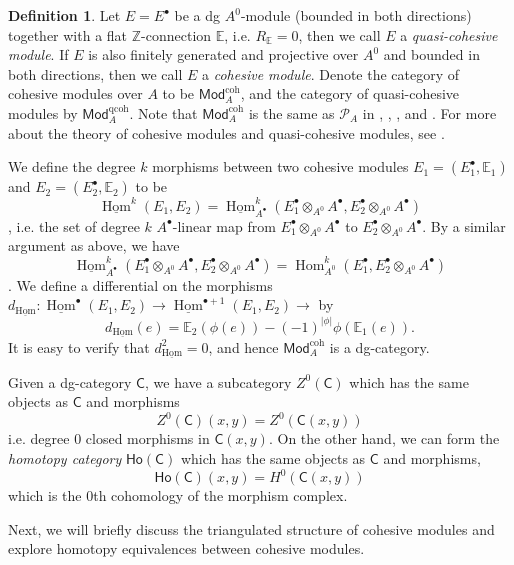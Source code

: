 \documentclass[12pt]{amsart}
\theoremstyle{definition}
\newtheorem{defn}[thm]{Definition}
\theoremstyle{remark}
\numberwithin{equation}{section}
\newcommand{\CC}{{\mathsf C}}
\newcommand{\Z}{{\mathbb{Z}}}
\newcommand{\1}{{\mathbb{1}}}
\newcommand{\Mod}{\mathsf{Mod}}
\newcommand{\ho}{\mathsf{Ho}}
\newcommand{\coh}{{\operatorname{coh}}}
\newcommand{\qcoh}{{\operatorname{qcoh}}}
\newcommand{\Hom}{\operatorname{Hom}}
\newcommand{\HOM}{\underline{\operatorname{Hom}}}
\begin{document}
\begin{defn}
    Let $E = E^{\bullet}$ be a dg ${A}^0$-module (bounded in both directions) together with a flat $\Z$-connection $\mathbb{E}$, i.e. $R_{\mathbb{E}} = 0$, then we call $E$ a {\it quasi-cohesive module}. If $E$ is also finitely generated and projective over $A^0$ and bounded in both directions, then we call $E$ a {\it cohesive module}. Denote the category of cohesive modules over ${A}$ to be $\Mod^{\coh}_{{A}}$, and the category of quasi-cohesive modules by $\Mod^{\qcoh}_{{A}}$. Note that $\Mod^{\coh}_{{A}}$ is the same as $\mathcal{P}_A$ in \cite{Blo05}, \cite{BS14}, \cite{BD10}, and \cite{BZ21}. For more about the theory of cohesive modules and quasi-cohesive modules, see \cite{Blo05}.
\end{defn}

We define the degree $k$ morphisms between two cohesive modules $E_1 = (E_1^{\bullet}, \mathbb{E}_1)$ and $E_2 = (E_2^{\bullet}, \mathbb{E}_2)$ to be $$
\HOM^k(E_1, E_2) =  \HOM_{A^{\bullet}}^k(E^{\bullet}_1\otimes_{ A^0} A^{\bullet}, E^{\bullet}_2\otimes_{ A^0} A^{\bullet})
$$
, i.e. the set of degree $k$ $A^{\bullet}$-linear map from $E^{\bullet}_1\otimes_{ A^0} A^{\bullet}$ to  $E^{\bullet}_2\otimes_{ A^0} A^{\bullet}$. By a similar argument as above, we have 
$$
\HOM_{A^{\bullet}}^k(E^{\bullet}_1\otimes_{ A^0} A^{\bullet}, E^{\bullet}_2\otimes_{ A^0} A^{\bullet}) = \Hom_{A^{0}}^k(E^{\bullet}_1, E^{\bullet}_2\otimes_{ A^0} A^{\bullet})
$$. We define a differential on the morphisms $d_{\HOM}: \HOM^{\bullet}(E_1, E_2) \to \HOM^{\bullet + 1}(E_1, E_2) \to$ by 
$$
d_{\HOM}(e) = \mathbb{E}_2(\phi(e)) - (-1)^{|\phi|}\phi(\mathbb{E}_1(e)).
$$
It is easy to verify that $d_{\HOM}^2 = 0$, and hence $\Mod^{\coh}_{{A}}$ is a dg-category.

Given a dg-category $\CC$, we have a subcategory $Z^0(\CC)$ which has the same objects as $\CC$ and morphisms
$$
Z^0(\CC)(x, y) = Z^0(\CC(x, y))
$$
i.e. degree 0 closed morphisms in $\CC(x, y)$. On the other hand, we can form the {\it homotopy category} $\ho(\CC)$ which has the same objects as $\CC$ and morphisms, 
$$
\ho(\CC)(x,y) = H^0(\CC(x,y))
$$
which is the 0th cohomology of the morphism complex.


Next, we will briefly discuss the triangulated structure of cohesive modules and explore homotopy equivalences between cohesive modules. 
\end{document}
